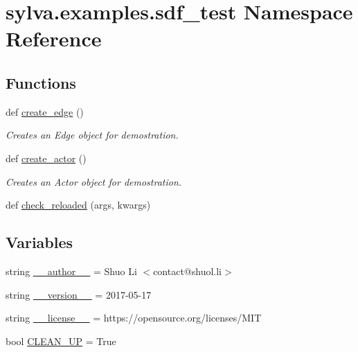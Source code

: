 \hypertarget{namespacesylva_1_1examples_1_1sdf__test}{}\section{sylva.\+examples.\+sdf\+\_\+test Namespace Reference}
\label{namespacesylva_1_1examples_1_1sdf__test}
\subsection*{Functions}
\begin{DoxyCompactItemize}
\item 
def \hyperlink{namespacesylva_1_1examples_1_1sdf__test_a58de2de4ff42625dbc8abfbf7c06f34e}{create\+\_\+edge} ()
\begin{DoxyCompactList}\small\item\em Creates an Edge object for demostration. \end{DoxyCompactList}\item 
def \hyperlink{namespacesylva_1_1examples_1_1sdf__test_a76589ddbcc30881033648fc0cf368f7e}{create\+\_\+actor} ()
\begin{DoxyCompactList}\small\item\em Creates an Actor object for demostration. \end{DoxyCompactList}\item 
def \hyperlink{namespacesylva_1_1examples_1_1sdf__test_aa26a40c94584da30c0ad626c2186425e}{check\+\_\+reloaded} (args, kwargs)
\end{DoxyCompactItemize}
\subsection*{Variables}
\begin{DoxyCompactItemize}
\item 
string \hyperlink{namespacesylva_1_1examples_1_1sdf__test_a6995eaf9ef18438a04bb042b7d402a6d}{\+\_\+\+\_\+author\+\_\+\+\_\+} = \textquotesingle{}Shuo Li $<$contact@shuol.\+li$>$\textquotesingle{}
\item 
string \hyperlink{namespacesylva_1_1examples_1_1sdf__test_a0023d81dcb7de691b3a3e5aa81340225}{\+\_\+\+\_\+version\+\_\+\+\_\+} = \textquotesingle{}2017-\/05-\/17\textquotesingle{}
\item 
string \hyperlink{namespacesylva_1_1examples_1_1sdf__test_a41add36b86e53162d5a60486d8c7d52e}{\+\_\+\+\_\+license\+\_\+\+\_\+} = \textquotesingle{}https\+://opensource.\+org/licenses/M\+IT\textquotesingle{}
\item 
bool \hyperlink{namespacesylva_1_1examples_1_1sdf__test_a0dbd7f2e3b348cd7554e6e3512811d72}{C\+L\+E\+A\+N\+\_\+\+UP} = True
\end{DoxyCompactItemize}


